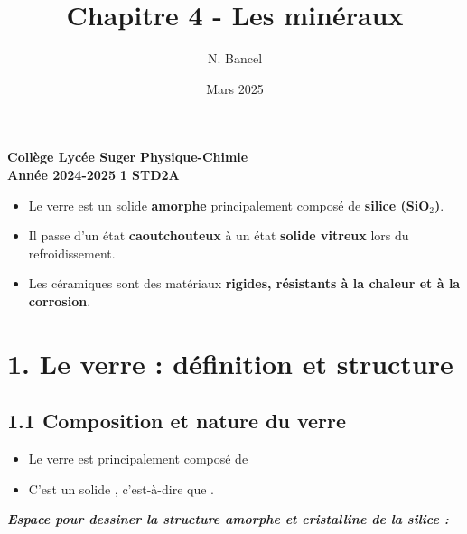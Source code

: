 \documentclass[a4paper,12pt]{article}
\title{Chapitre 4 - Les minéraux}
\author{N. Bancel}
\date{Mars 2025}
\newif\ifprof
\newcommand{\proftext}[1]{\ifprof {\textcolor{blue}{#1}} \fi}
\begin{document}
\textbf{Collège Lycée Suger}
\hfill
\textbf{Physique-Chimie} \\

\textbf{Année 2024-2025}
\hfill
\textbf{1\textsuperscript{} STD2A} \par

{\let\newpage\relax\maketitle}

\begin{tcolorbox}[colback=blue!5!white, colframe=blue!80!black, title=\textbf{\underline{\large À retenir}}]
\begin{itemize}
    \item Le verre est un solide \textbf{amorphe} principalement composé de \textbf{silice (SiO$_2$)}.
    \item Il passe d'un état \textbf{caoutchouteux} à un état \textbf{solide vitreux} lors du refroidissement.
    \item Les céramiques sont des matériaux \textbf{rigides, résistants à la chaleur et à la corrosion}.
\end{itemize}
\end{tcolorbox}

\section*{1. Le verre : définition et structure}
\subsection*{1.1 Composition et nature du verre}
\begin{itemize}
    \item Le verre est principalement composé de \hspace{4cm} \\
    \proftext{(réponse : dioxyde de silicium, SiO$_2$)}
    \item C'est un solide \hspace{1cm}, c'est-à-dire que \hspace{1cm}.
    \proftext{(réponse : amorphe ; sa structure n’est pas régulière comme un cristal)}
\end{itemize}



\begin{center}
\textit{\textbf{Espace pour dessiner la structure amorphe et cristalline de la silice :}}

\vspace{3cm}
\end{center}
\end{document}
